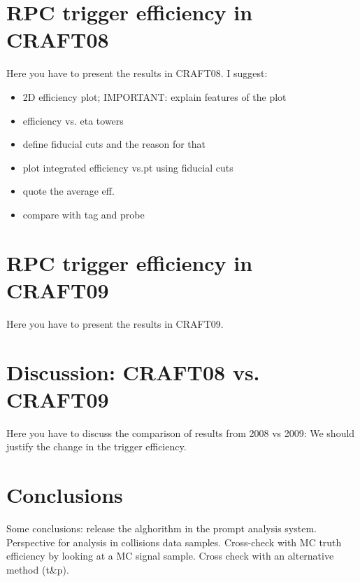 \section{RPC trigger efficiency in CRAFT08}
Here you have to present the results in CRAFT08.
I suggest:
\begin{itemize}
\item
2D efficiency plot; IMPORTANT: explain features of the plot 
\item
efficiency vs. eta towers
\item
define fiducial cuts and the reason for that
\item
plot integrated efficiency vs.pt using fiducial cuts
\item
quote the average eff.
\item
compare with tag and probe
\end{itemize}

\section{RPC trigger efficiency in CRAFT09}
Here you have to present the results
in CRAFT09.

\section{Discussion: CRAFT08 vs. CRAFT09}
Here you have to discuss the comparison
of results from 2008 vs 2009:
We should justify the change in the trigger efficiency.

\section{Conclusions}
Some conclusions: release the alghorithm in the prompt 
analysis system.
Perspective for analysis in collisions data samples.
Cross-check with MC truth efficiency by looking at 
a MC signal sample. Cross check with an alternative
method (t\&p).



%

